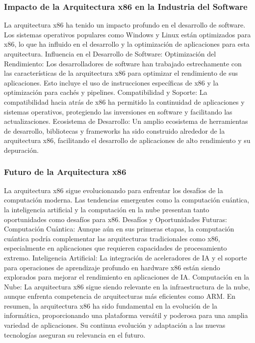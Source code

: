 \documentclass[12pt,twoside]{templates/unerthesis}
\begin{document}
\hypertarget{impacto-de-la-arquitectura-x86-en-la-industria-del-software}{%
\subsubsection{Impacto de la Arquitectura x86 en la Industria del Software}\label{impacto-de-la-arquitectura-x86-en-la-industria-del-software}}

La arquitectura x86 ha tenido un impacto profundo en el desarrollo de software. Los sistemas operativos populares como Windows y Linux están optimizados para x86, lo que ha influido en el desarrollo y la optimización de aplicaciones para esta arquitectura.
Influencia en el Desarrollo de Software:
Optimización del Rendimiento: Los desarrolladores de software han trabajado estrechamente con las características de la arquitectura x86 para optimizar el rendimiento de sus aplicaciones. Esto incluye el uso de instrucciones específicas de x86 y la optimización para cachés y pipelines.
Compatibilidad y Soporte: La compatibilidad hacia atrás de x86 ha permitido la continuidad de aplicaciones y sistemas operativos, protegiendo las inversiones en software y facilitando las actualizaciones.
Ecosistema de Desarrollo: Un amplio ecosistema de herramientas de desarrollo, bibliotecas y frameworks ha sido construido alrededor de la arquitectura x86, facilitando el desarrollo de aplicaciones de alto rendimiento y su depuración.

\hypertarget{futuro-de-la-arquitectura-x86}{%
\subsubsection{Futuro de la Arquitectura x86}\label{futuro-de-la-arquitectura-x86}}

La arquitectura x86 sigue evolucionando para enfrentar los desafíos de la computación moderna. Las tendencias emergentes como la computación cuántica, la inteligencia artificial y la computación en la nube presentan tanto oportunidades como desafíos para x86.
Desafíos y Oportunidades Futuras:
Computación Cuántica: Aunque aún en sus primeras etapas, la computación cuántica podría complementar las arquitecturas tradicionales como x86, especialmente en aplicaciones que requieren capacidades de procesamiento extremo.
Inteligencia Artificial: La integración de aceleradores de IA y el soporte para operaciones de aprendizaje profundo en hardware x86 están siendo explorados para mejorar el rendimiento en aplicaciones de IA.
Computación en la Nube: La arquitectura x86 sigue siendo relevante en la infraestructura de la nube, aunque enfrenta competencia de arquitecturas más eficientes como ARM.
En resumen, la arquitectura x86 ha sido fundamental en la evolución de la informática, proporcionando una plataforma versátil y poderosa para una amplia variedad de aplicaciones. Su continua evolución y adaptación a las nuevas tecnologías aseguran su relevancia en el futuro.
\end{document}
